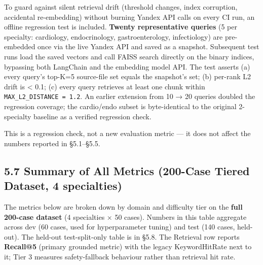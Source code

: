 \documentclass[
  american,
  a4paper,
]{article}
\begin{document}
To guard against silent retrieval drift (threshold changes, index
corruption, accidental re-embedding) without burning Yandex API calls on
every CI run, an offline regression test is included. \textbf{Twenty
representative queries} (5 per specialty: cardiology, endocrinology,
gastroenterology, infectiology) are pre-embedded once via the live
Yandex API and saved as a snapshot. Subsequent test runs load the saved
vectors and call FAISS search directly on the binary indices, bypassing
both LangChain and the embedding model API. The test asserts (a) every
query's top-K=5 source-file set equals the snapshot's set; (b) per-rank
L2 drift is \textless{} 0.1; (c) every query retrieves at least one
chunk within \texttt{MAX\_L2\_DISTANCE\ =\ 1.2}. An earlier extension
from 10 → 20 queries doubled the regression coverage; the cardio/endo
subset is byte-identical to the original 2-specialty baseline as a
verified regression check.

This is a regression check, not a new evaluation metric --- it does not
affect the numbers reported in §5.1--§5.5.

\subsection{5.7 Summary of All Metrics (200-Case Tiered Dataset, 4
specialties)}\label{summary-of-all-metrics-200-case-tiered-dataset-4-specialties}

The metrics below are broken down by domain and difficulty tier on the
\textbf{full 200-case dataset} (4 specialties × 50 cases). Numbers in
this table aggregate across dev (60 cases, used for hyperparameter
tuning) and test (140 cases, held-out). The held-out test-split-only
table is in §5.8. The Retrieval row reports \textbf{Recall@5} (primary
grounded metric) with the legacy KeywordHitRate next to it; Tier 3
measures safety-fallback behaviour rather than retrieval hit rate.
\end{document}
